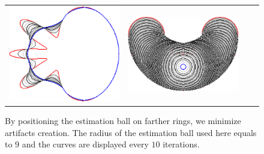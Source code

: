 {\begin{figure}
\begin{tabular}{p{3em}ccc}
\includegraphics[scale=0.25]{figures/chapter6/level-effect/flower/improve/len_pen0/radius-9/level9/summary.pdf} &
\includegraphics[scale=0.25]{figures/chapter6/level-effect/bean/improve/len_pen0/radius-9/level9/summary.pdf} \\[2em]
\end{tabular}
\caption{By positioning the estimation ball on farther rings, we minimize artifacts creation. The radius of the estimation ball used here equals to $9$ and the curves are displayed every $10$ iterations. \label{fig:mx-square-flow}}
\end{figure}

}
